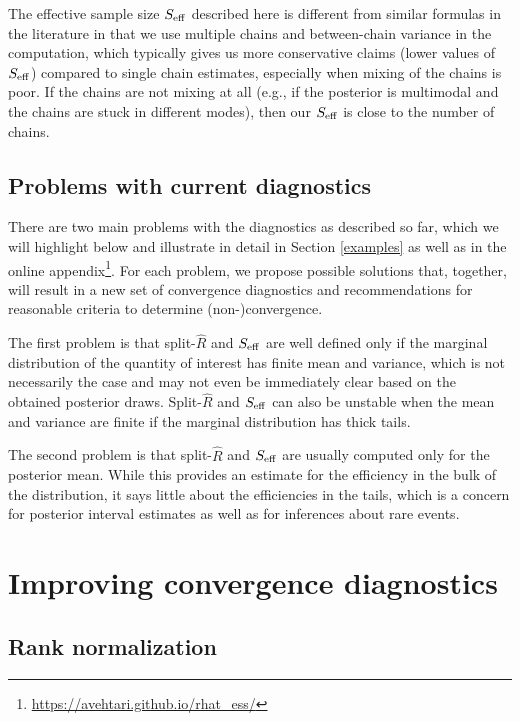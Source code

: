 \documentclass[american,]{article}
\let\rmarkdownfootnote\footnote%
\def\footnote{\protect\rmarkdownfootnote}
\begin{document}
The effective sample size \(S_{\rm eff}\) described here is different
from similar formulas in the literature in that we use multiple chains
and between-chain variance in the computation, which typically gives us
more conservative claims (lower values of \(S_{\rm eff}\)) compared to
single chain estimates, especially when mixing of the chains is poor. If
the chains are not mixing at all (e.g., if the posterior is multimodal and
the chains are stuck in different modes), then our \(S_{\rm eff}\) is
close to the number of chains.

\hypertarget{problems-of-current-diagnostics}{%
\subsection{Problems with current
diagnostics}\label{problems-of-current-diagnostics}}

There are two main problems with the diagnostics as described so far, which we
will highlight below and illustrate in detail in Section \ref{examples} as well 
as in the online appendix\footnote{\url{https://avehtari.github.io/rhat_ess/}}. For each problem, we propose possible solutions 
that, together, will result in a new set of convergence diagnostics and 
recommendations for reasonable criteria to determine (non-)convergence.

The first problem is that split-\(\widehat{R}\) and \(S_{\rm eff}\)
are well defined only if the marginal distribution of the quantity of interest has finite 
mean and variance, which is not necessarily the case and may not even be immediately
clear based on the obtained posterior draws. Split-\(\widehat{R}\) and 
\(S_{\rm eff}\) can also be unstable when the mean and variance are 
finite if the marginal distribution has thick tails. 

The second problem is that split-\(\widehat{R}\) and \(S_{\rm eff}\) are 
usually computed only for the posterior mean. While this provides an estimate 
for the efficiency in the bulk of the distribution, it says little about the 
efficiencies in the tails, which is a concern for posterior 
interval estimates as well as for inferences about rare events.

\hypertarget{improving-convergence-diagnostics}{%
\section{Improving convergence
diagnostics}\label{improving-convergence-diagnostics}}

\hypertarget{rank-normalization}{%
\subsection{Rank normalization}\label{rank-normalization}}
\end{document}

